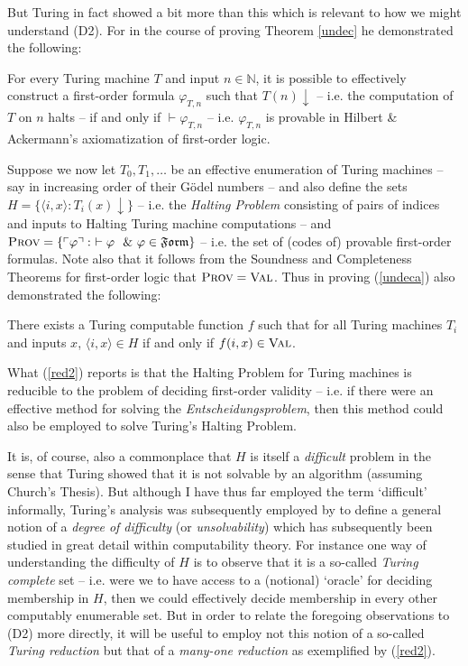 \documentclass[11pt,fleqn,leqno]{article}
\def\phi{\varphi}
\def\proves{\vdash}
\begin{document}
But Turing in fact showed a bit more than this which is relevant to how we might understand (D2).  For in the course of proving Theorem \ref{undec} he demonstrated the following: 
\begin{example}
\label{undeca}
For every Turing machine $T$ and input $n \in \mathbb{N}$, it is possible to effectively construct a first-order formula $\phi_{T,n}$ such that $T(n)\downarrow$ -- i.e. the computation of $T$ on $n$ halts -- if and only if $\proves \phi_{T,n}$ -- i.e. $\phi_{T,n}$ is provable in Hilbert \& Ackermann's axiomatization of first-order logic.  
\end{example}
Suppose we now let $T_0,T_1,\ldots$ be an effective enumeration of Turing machines -- say in increasing order of their G\"odel numbers -- and also define the sets $H = \{\langle i,x\rangle : T_i(x) \downarrow\}$ -- i.e. the \textsl{Halting Problem} consisting of pairs of indices and inputs to Halting Turing machine computations -- and$\textsc{Prov} = \{\ulcorner \phi \urcorner : \ \proves \phi\ \ \& \ \phi \in \mathfrak{Form}\}$ -- i.e. the set of (codes of) provable first-order formulas.   Note also that it follows from the Soundness and Completeness Theorems for first-order logic that $\textsc{Prov} = \textsc{Val}$.     Thus in proving (\ref{undeca}) \citet[pp. 259-263]{Turing1936} also demonstrated the following:
\begin{example} \label{red2} There exists a Turing computable function $f$ such that for all Turing machines $T_i$ and inputs $x$, $\langle i,x \rangle \in H$ if and only if $f(i,x) \in \textsc{Val}$.
\end{example}
What (\ref{red2}) reports is that the Halting Problem for Turing machines is reducible to the problem of deciding first-order validity -- i.e. if there were an effective method for solving the \textsl{Entscheidungsproblem}, then this method could also be employed to solve Turing's Halting Problem.

It is, of course, also a commonplace that $H$ is itself a \textsl{difficult} problem in the sense that Turing showed that it is not solvable by an algorithm (assuming Church's Thesis).    But although I have thus far employed the term `difficult'  informally, Turing's analysis was subsequently employed by \citet{Post1944} to define a general notion of a  \textsl{degree of difficulty} (or \textsl{unsolvability}) which has subsequently been studied in great detail within computability theory.   For instance one way of understanding the difficulty of $H$ is to observe that it is a so-called \textsl{Turing complete} set -- i.e. were we to have access to a (notional) `oracle' for deciding membership in $H$, then we could effectively decide membership in every other computably enumerable set.  But in order to relate the foregoing observations to (D2) more directly, it will be useful to employ not this notion of a so-called \textsl{Turing reduction} but that of a \textsl{many-one reduction} as exemplified by (\ref{red2}).
\end{document}
